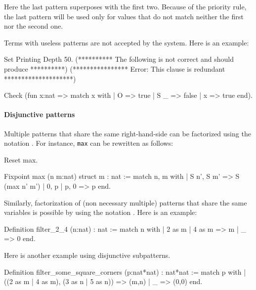Here the last pattern superposes with the first two. Because
of the priority rule, the last pattern 
will be used only for values that do not match neither the  first nor
the second one.  

Terms with useless patterns are not accepted by the
system. Here is an example:
\begin{coq_eval}
Set Printing Depth 50.
  (********** The following is not correct and should produce **********)
  (**************** Error: This clause is redundant ********************)
\end{coq_eval}
\begin{coq_example}
Check (fun x:nat =>
         match x with
         | O => true
         | S _ => false
         | x => true
         end).
\end{coq_example}

\paragraph{Disjunctive patterns}

Multiple patterns that share the same right-hand-side can be
factorized using the notation \nelist{\multpattern}{\tt |}. For instance,
{\tt max} can be rewritten as follows:

\begin{coq_eval}
Reset max.
\end{coq_eval}
\begin{coq_example}
Fixpoint max (n m:nat) {struct m} : nat :=
  match n, m with
  | S n', S m' => S (max n' m')
  | 0, p | p, 0 => p
  end.
\end{coq_example}

Similarly, factorization of (non necessary multiple) patterns
that share the same variables is possible by using the notation
\nelist{\pattern}{\tt |}. Here is an example:

\begin{coq_example}
Definition filter_2_4 (n:nat) : nat :=
  match n with
  | 2 as m | 4 as m => m
  | _ => 0
  end.
\end{coq_example}

Here is another example using disjunctive subpatterns.

\begin{coq_example}
Definition filter_some_square_corners (p:nat*nat) : nat*nat :=
  match p with
  | ((2 as m | 4 as m), (3 as n | 5 as n)) => (m,n)
  | _ => (0,0)
  end.
\end{coq_example}

